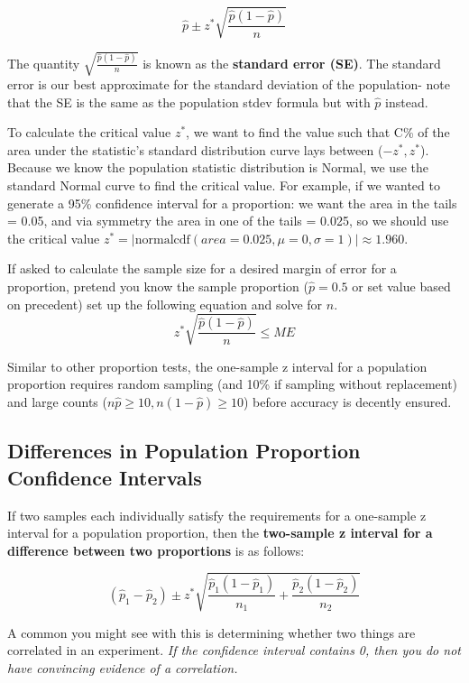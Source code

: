 \documentclass[12pt, a4paper]{article}
\theoremstyle{definition}
\begin{document}
\[\hat{p} \pm z^{*} \sqrt{\frac{\hat{p} (1 - \hat{p})}{n}}\]

The quantity $\sqrt{\frac{\hat{p} (1 - \hat{p})}{n}}$ is known as the \textbf{standard error (SE)}.
The standard error is our best approximate for the standard deviation of the population- note that the SE is the same as the population stdev formula but with $\hat{p}$ instead.

To calculate the critical value $z^{*}$, we want to find the value such that C\% of the area under the statistic's standard distribution curve lays between ($-z^{*}, z^{*}$).
Because we know the population statistic distribution is Normal, we use the standard Normal curve to find the critical value.
For example, if we wanted to generate a 95\% confidence interval for a proportion: we want the area in the tails = 0.05, and via symmetry the area in one of the tails = 0.025, so we should use the critical value $z^{*} = |\textrm{normalcdf}(area = 0.025, \mu = 0, \sigma = 1)| \approx 1.960$.

If asked to calculate the sample size for a desired margin of error for a proportion, pretend you know the sample proportion ($\hat{p} = 0.5$ or set value based on precedent) set up the following equation and solve for $n$.
\[z^{*} \sqrt{\frac{\hat{p} (1 - \hat{p})}{n}} \leq ME\]

Similar to other proportion tests, the one-sample z interval for a population proportion requires random sampling (and 10\% if sampling without replacement) and large counts ($n\hat{p} \geq 10, n(1- \hat{p}) \geq 10$) before accuracy is decently ensured.

\subsection{Differences in Population Proportion Confidence Intervals}
If two samples each individually satisfy the requirements for a one-sample z interval for a population proportion, then the \textbf{two-sample z interval for a difference between two proportions} is as follows:

\[(\hat{p}_1 - \hat{p}_2) \pm z^{*} \sqrt{
    \frac{\hat{p}_1 (1 - \hat{p}_1)}{n_1} +
    \frac{\hat{p}_2 (1 - \hat{p}_2)}{n_2}
}\]

A common you might see with this is determining whether two things are correlated in an experiment.
\textit{If the confidence interval contains 0, then you do not have convincing evidence of a correlation.}
\end{document}
